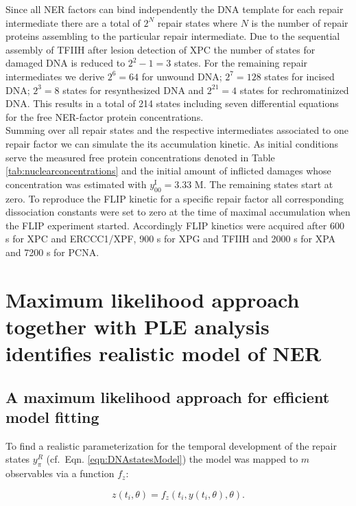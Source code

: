 Since all NER factors can bind independently the DNA template for each repair intermediate there are a total of $ 2^N $ repair states where $ N $ is the number of repair proteins assembling to the particular repair intermediate. Due to the sequential assembly of TFIIH after lesion detection of XPC the number of states for damaged DNA is reduced to $ 2^2-1 = 3$ states. For the remaining repair intermediates we derive  $ 2^6 = 64$ for unwound DNA; $ 2^7 = 128$ states for incised DNA; $ 2^3 = 8$ states for resynthesized DNA and $ 2^21 = 4$ states for rechromatinized DNA. This results in a total of 214 states including seven differential equations for the free NER-factor protein concentrations. \\
Summing over all repair states and the respective intermediates associated to one repair factor we can simulate the its accumulation kinetic. As initial conditions serve the measured free protein concentrations denoted in Table \ref{tab:nuclearconcentrations}\cite{Terstiege2010,Luijsterburg2010} and the initial amount of inflicted damages whose concentration was estimated with  $y_{00}^{\text{I}} = 3.33$ \textmu M. The remaining states start at zero. To reproduce the FLIP kinetic for a specific repair factor all corresponding dissociation constants were set to zero at the time of maximal accumulation when the FLIP experiment started. Accordingly FLIP kinetics were acquired after 600 s for XPC and ERCCC1/XPF, 900 s for XPG and TFIIH and 2000 s for XPA and 7200 s for PCNA. 

 
\section{Maximum likelihood approach together with PLE analysis identifies realistic model of NER}
\subsection{A maximum likelihood approach for efficient model fitting}

To find a realistic parameterization for the temporal development of the repair states $y_\pi^R$ (cf.\ Eqn. \ref{eqn:DNAstatesModel}) the model was mapped to $m$ observables via a function $f_z$:

  \begin{equation}
  	z(t_i,\theta) = f_z(t_i,y(t_i,\theta),\theta).
  \end{equation} 

